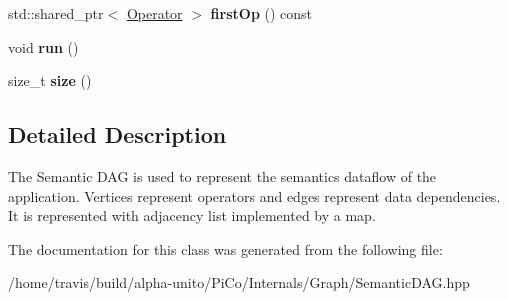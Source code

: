 \begin{DoxyCompactItemize}
\item 
\hypertarget{class_semantic_d_a_g_ab96250cbbb40055b878c59e3bdd49961}{std\-::shared\-\_\-ptr$<$ \hyperlink{class_operator}{\-Operator} $>$ {\bfseries first\-Op} () const }\label{class_semantic_d_a_g_ab96250cbbb40055b878c59e3bdd49961}

\item 
\hypertarget{class_semantic_d_a_g_af4c527c88b2d24640e11fa16a8caf6a1}{void {\bfseries run} ()}\label{class_semantic_d_a_g_af4c527c88b2d24640e11fa16a8caf6a1}

\item 
\hypertarget{class_semantic_d_a_g_a08f38d352f8443b9df101dd3d319829e}{size\-\_\-t {\bfseries size} ()}\label{class_semantic_d_a_g_a08f38d352f8443b9df101dd3d319829e}

\end{DoxyCompactItemize}


\subsection{\-Detailed \-Description}
\-The \-Semantic \-D\-A\-G is used to represent the semantics dataflow of the application. \-Vertices represent operators and edges represent data dependencies. \-It is represented with adjacency list implemented by a map. 

\-The documentation for this class was generated from the following file\-:\begin{DoxyCompactItemize}
\item 
/home/travis/build/alpha-\/unito/\-Pi\-Co/\-Internals/\-Graph/\-Semantic\-D\-A\-G.\-hpp\end{DoxyCompactItemize}
